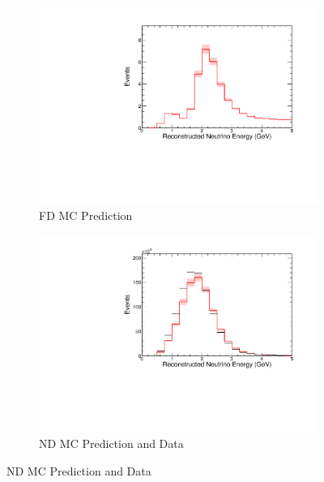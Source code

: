 {\begin{figure}
\end{figure}



\begin{figure}
\begin{center}
\begin{subfigure}[c]{0.49\textwidth}
\includegraphics[width=\textwidth]{figures/systs/prediction/fd_mc_prediction_MvCCRES.pdf}
\caption*{FD MC Prediction}
\end{subfigure}
\begin{subfigure}[c]{0.49\textwidth}
\includegraphics[width=\textwidth]{figures/systs/prediction/nd_mc_prediction_MvCCRES.pdf}
\caption*{ND MC Prediction and Data}
\end{subfigure}

\vspace{20pt}


\end{center}
\end{figure}}
